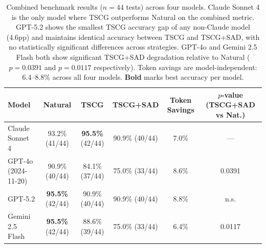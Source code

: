 \begin{table}[t]
\centering
\small
\begin{tabular}{@{}l cccc c@{}}
\toprule
\textbf{Model} & \textbf{Natural} & \textbf{TSCG} & \textbf{TSCG+SAD} & \textbf{Token Savings} & \textbf{$p$-value (TSCG+SAD vs Nat.)} \\
\midrule
Claude Sonnet 4     & 93.2\% (41/44) & \textbf{95.5\%} (42/44) & 90.9\% (40/44) & 7.0\% & --- \\
GPT-4o (2024-11-20) & 90.9\% (40/44) & 84.1\% (37/44) & 75.0\% (33/44) & 8.6\% & 0.0391 \\
GPT-5.2             & \textbf{95.5\%} (42/44) & 90.9\% (40/44) & 90.9\% (40/44) & 8.8\% & n.s. \\
Gemini 2.5 Flash    & \textbf{95.5\%} (42/44) & 88.6\% (39/44) & 75.0\% (33/44) & 6.4\% & 0.0117 \\
\bottomrule
\end{tabular}
\caption{Combined benchmark results ($n=44$ tests) across four models. Claude Sonnet 4 is the only model where TSCG outperforms Natural on the combined metric. GPT-5.2 shows the smallest TSCG accuracy gap of any non-Claude model (4.6pp) and maintains identical accuracy between TSCG and TSCG+SAD, with no statistically significant differences across strategies. GPT-4o and Gemini 2.5 Flash both show significant TSCG+SAD degradation relative to Natural ($p=0.0391$ and $p=0.0117$ respectively). Token savings are model-independent: 6.4--8.8\% across all four models. \textbf{Bold} marks best accuracy per model.}
\label{tab:multimodel-combined}
\end{table}
